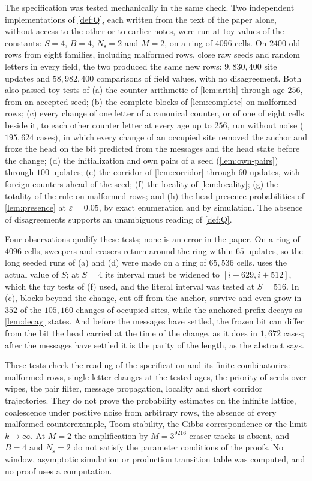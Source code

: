 \documentclass[11pt]{article}
\theoremstyle{plain}
\theoremstyle{definition}
\theoremstyle{remark}
\newcommand{\eps}{\varepsilon}
\begin{document}
The specification was tested mechanically in the same check. Two independent implementations of \cref{def:Q}, each written from the text of the paper alone, without access to the other or to earlier notes, were run at toy values of the constants: $S=4$, $B=4$, $N_{\mathrm s}=2$ and $M=2$, on a ring of $4096$ cells. On $2400$ old rows from eight families, including malformed rows, close raw seeds and random letters in every field, the two produced the same new rows: $9{,}830{,}400$ site updates and $58{,}982{,}400$ comparisons of field values, with no disagreement. Both also passed toy tests of (a) the counter arithmetic of \cref{lem:arith} through age $256$, from an accepted seed; (b) the complete blocks of \cref{lem:complete} on malformed rows; (c) every change of one letter of a canonical counter, or of one of eight cells beside it, to each other counter letter at every age up to $256$, run without noise ($195{,}624$ cases), in which every change of an occupied site removed the anchor and froze the head on the bit predicted from the messages and the head state before the change; (d) the initialization and own pairs of a seed (\cref{lem:own-pairs}) through $100$ updates; (e) the corridor of \cref{lem:corridor} through $60$ updates, with foreign counters ahead of the seed; (f) the locality of \cref{lem:locality}; (g) the totality of the rule on malformed rows; and (h) the head-presence probabilities of \cref{lem:presence} at $\eps=0.05$, by exact enumeration and by simulation. The absence of disagreements supports an unambiguous reading of \cref{def:Q}.

Four observations qualify these tests; none is an error in the paper. On a ring of $4096$ cells, sweepers and erasers return around the ring within $65$ updates, so the long seeded runs of (a) and (d) were made on a ring of $65{,}536$ cells.  uses the actual value of $S$; at $S=4$ its interval must be widened to $[i-629,i+512]$, which the toy tests of (f) used, and the literal interval was tested at $S=516$. In (c), blocks beyond the change, cut off from the anchor, survive and even grow in $352$ of the $105{,}160$ changes of occupied sites, while the anchored prefix decays as \cref{lem:decay} states. And before the messages have settled, the frozen bit can differ from the bit the head carried at the time of the change, as it does in $1{,}672$ cases; after the messages have settled it is the parity of the length, as the abstract says.

These tests check the reading of the specification and its finite combinatorics: malformed rows, single-letter changes at the tested ages, the priority of seeds over wipes, the pair filter, message propagation, locality and short corridor trajectories. They do not prove the probability estimates on the infinite lattice, coalescence under positive noise from arbitrary rows, the absence of every malformed counterexample, Toom stability, the Gibbs correspondence or the limit $k\to\infty$. At $M=2$ the amplification by $M=3^{9216}$ eraser tracks is absent, and $B=4$ and $N_{\mathrm s}=2$ do not satisfy the parameter conditions of the proofs. No window, asymptotic simulation or production transition table was computed, and no proof uses a computation.
\end{document}

